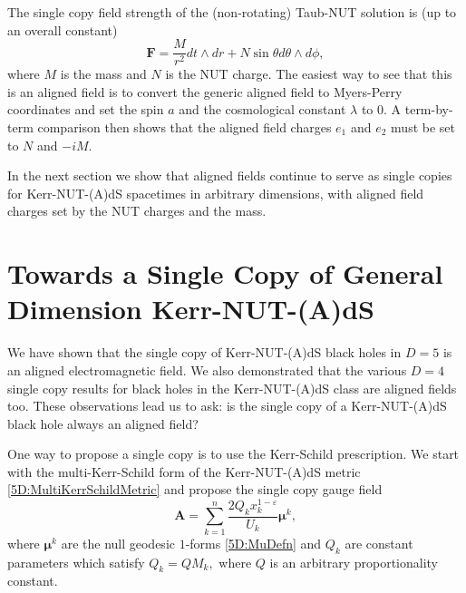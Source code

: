 The single copy field strength of the (non-rotating) Taub-NUT solution is (up to an overall constant)
\cite{Luna:2015paa}
%
\begin{equation} 
    \mathbf{F} = \frac{M}{r^{2}} dt \wedge dr + N \sin \theta d\theta \wedge d\phi,
\end{equation}
%
where $M$ is the mass and $N$ is the NUT charge. The easiest way to see that this is an aligned field is to
convert the generic aligned field to Myers-Perry coordinates and set the spin $a$ and the
cosmological constant $\lambda$ to $0$. A term-by-term comparison then shows that the aligned field charges
$e_{1}$ and $e_{2}$ must be set to $N$ and $-iM$.

In the next section we show that aligned fields continue to serve as single copies for Kerr-NUT-(A)dS spacetimes in
arbitrary dimensions, with aligned field charges set by the NUT charges and the mass.

\section{Towards a Single Copy of General Dimension Kerr-NUT-(A)dS} \label{5D:sec:GeneralDSingleCopy} 
%
We have shown that the single copy of Kerr-NUT-(A)dS black holes in $D = 5$ is an aligned electromagnetic
field. We also demonstrated that the various $D = 4$ single copy results for black holes in the Kerr-NUT-(A)dS
class are aligned fields too. These observations lead us to ask: is the single copy of a Kerr-NUT-(A)dS black
hole always an aligned field?

One way to propose a single copy is to use the Kerr-Schild prescription. We start with the multi-Kerr-Schild form of the Kerr-NUT-(A)dS metric
\eqref{5D:MultiKerrSchildMetric} and propose the single copy gauge field
%
\begin{equation} \label{5D:singleCopyMultiKerrSchild} 
    \mathbf{A} = \sum_{k = 1}^{n} \frac{2Q_{k}x_{k}^{1-\varepsilon}}{U_{k}} \boldsymbol{\mu}^{k},
\end{equation}
%
where $ \boldsymbol{\mu}^{k}$ are the null geodesic $1$-forms \eqref{5D:MuDefn} and $Q_{k}$ are constant parameters which satisfy
$Q_k=Q M_k,$ where $Q$ is an arbitrary proportionality constant.

